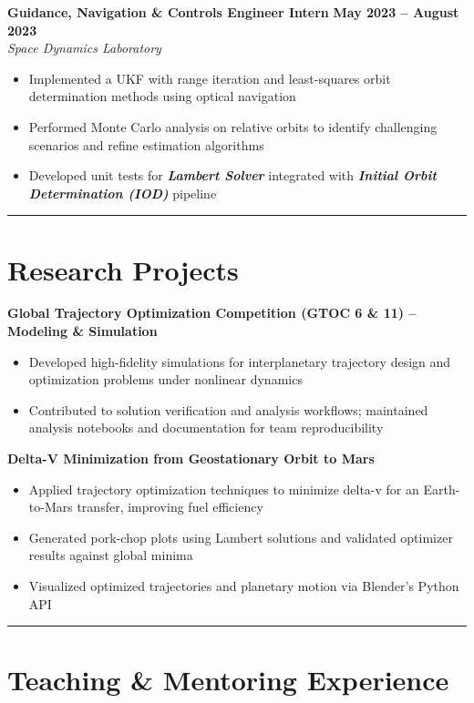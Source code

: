 \documentclass[10pt]{article}
\newcommand{\sectionline}{\noindent\rule{\linewidth}{0.4pt}}
\begin{document}
	\textbf{Guidance, Navigation \& Controls Engineer Intern} \hfill \textbf{May 2023 – August 2023} \\
	\emph{Space Dynamics Laboratory}
	\begin{itemize}
		\item Implemented a UKF with range iteration and least-squares orbit determination methods using optical navigation
		\item Performed Monte Carlo analysis on relative orbits to identify challenging scenarios and refine estimation algorithms
		\item Developed unit tests for \textbf{\emph{Lambert Solver}} integrated with \textbf{\emph{Initial Orbit Determination (IOD)}} pipeline
	\end{itemize}
	
	\newpage
	
	\sectionline
	
	\section*{Research Projects}
	
	\textbf{Global Trajectory Optimization Competition (GTOC 6 \& 11) – Modeling \& Simulation} 
	\begin{itemize}
		\item Developed high-fidelity simulations for interplanetary trajectory design and optimization problems under nonlinear dynamics
		    \item Contributed to solution verification and analysis workflows; maintained analysis notebooks and documentation for team reproducibility
	\end{itemize}
	
	\textbf{Delta-V Minimization from Geostationary Orbit to Mars}
	\begin{itemize}
		\item Applied trajectory optimization techniques to minimize delta-v for an Earth-to-Mars transfer, improving fuel efficiency
		\item Generated pork-chop plots using Lambert solutions and validated optimizer results against global minima
		\item Visualized optimized trajectories and planetary motion via Blender’s Python API
	\end{itemize}
	
	\sectionline
	
	\section*{Teaching \& Mentoring Experience}
	
\end{document}
